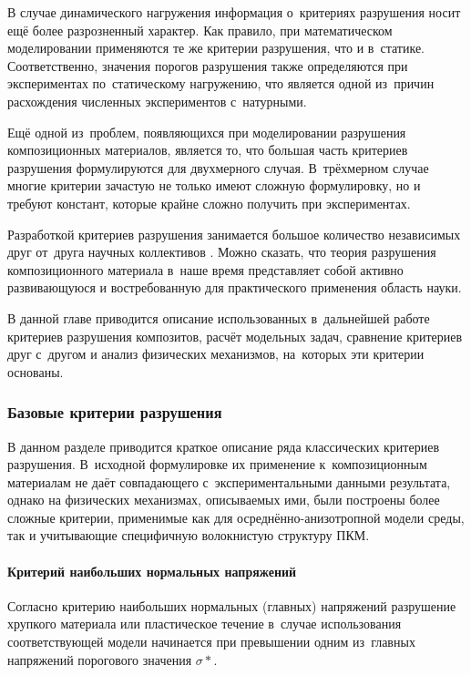 \documentclass[thesis.tex]{subfiles}
\begin{document}
В случае динамического нагружения информация о~критериях разрушения носит ещё более разрозненный характер. Как правило,
при математическом моделировании применяются те же критерии разрушения, что и в~статике. Соответственно, значения
порогов разрушения также определяются при экспериментах по~статическому нагружению, что является одной из~причин
расхождения численных экспериментов с~натурными.

Ещё одной из~проблем, появляющихся при моделировании разрушения композиционных материалов, является то, что большая
часть критериев разрушения формулируются для двухмерного случая. В~трёхмерном случае многие критерии зачастую не только
имеют сложную формулировку, но и требуют констант, которые крайне сложно получить при экспериментах.

Разработкой критериев разрушения занимается большое количество независимых друг от~друга научных коллективов
\cite{hinton2004failure}. Можно сказать, что теория разрушения композиционного материала в~наше время представляет
собой активно развивающуюся и востребованную для практического применения область науки.

В данной главе приводится описание использованных в~дальнейшей работе критериев разрушения композитов, расчёт
модельных задач, сравнение критериев друг с~другом и анализ физических механизмов, на~которых эти критерии основаны.

\subsubsection{Базовые критерии разрушения}
В данном разделе приводится краткое описание ряда классических критериев разрушения. В~исходной формулировке их
применение к~композиционным материалам не даёт совпадающего с~экспериментальными данными результата, однако на
физических механизмах, описываемых ими, были построены более сложные критерии, применимые как для осреднённо-анизотропной
модели среды, так и учитывающие специфичную волокнистую структуру ПКМ.

\paragraph{Критерий наибольших нормальных напряжений}
Согласно критерию наибольших нормальных (главных) напряжений разрушение хрупкого материала или пластическое
течение в~случае использования соответствующей модели начинается при превышении одним из~главных напряжений порогового
значения $\sigma*$\cite{надаи1954пластичность}.
\end{document}

